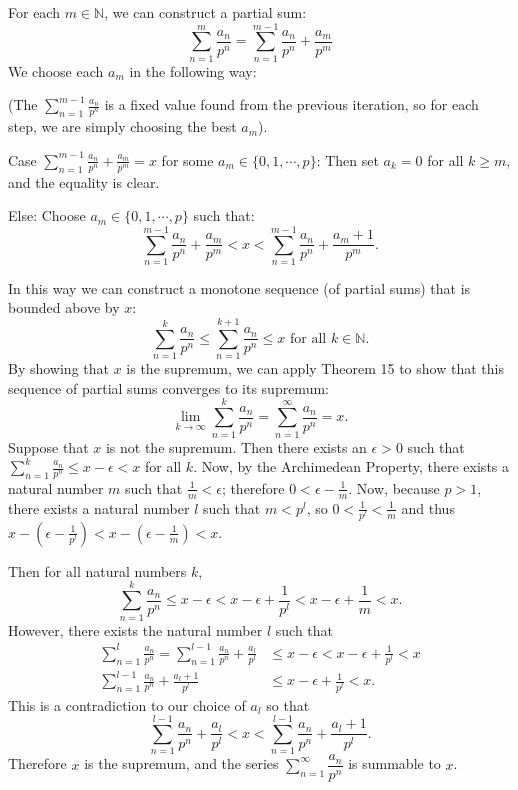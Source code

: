 \begin{enumerate}
	For each $m \in \mathbb{N}$, we can construct a partial sum:
	\[
		\sum_{n=1}^{m} \frac{a_n}{p^n} = \sum_{n=1}^{m-1} \frac{a_n}{p^n} + \frac{a_m}{p^m}	
	\]
	We choose each $a_m$ in the following way:\par
	(The $\sum_{n=1}^{m-1} \frac{a_n}{p^n}$ is a fixed value found from the previous iteration, so for each step, we are simply choosing the best $a_m$).
	\par
	Case $\sum_{n=1}^{m-1} \frac{a_n}{p^n} + \frac{a_m}{p^m} = x$ for some $a_m \in \{0,1,\cdots,p\}$:
	Then set $a_k=0$ for all $k \ge m$, and the equality is clear.\par
	Else: Choose $a_m \in \{0,1,\cdots,p\}$ such that:
	\[
		\sum_{n=1}^{m-1} \frac{a_n}{p^n} + \frac{a_m}{p^m} < x <  \sum_{n=1}^{m-1} \frac{a_n}{p^n} + \frac{a_m+1}{p^m}.	
	\]
	\par
	In this way we can construct a monotone sequence (of partial sums) that is bounded above by $x$:
	\[
	\sum_{n=1}^k \frac{a_n}{p^n} \le \sum_{n=1}^{k+1} \frac{a_n}{p^n} \le x \text{ for all }k \in \mathbb{N}.
	\]
	By showing that $x$ is the supremum, we can apply Theorem 15 to show that this sequence of partial sums converges to its supremum:
	\[
	\lim_{k\to\infty}\sum_{n=1}^k\frac{a_n}{p^n} = \sum_{n=1}^\infty\frac{a_n}{p^n} = x.
	\]
	Suppose that $x$ is not the supremum. 
	Then there exists an $\epsilon > 0$ such that $\sum_{n=1}^k \frac{a_n}{p^n} \le x-\epsilon < x$ for all $k$.
	Now, by the Archimedean Property, there exists a natural number $m$ such that $\frac{1}{m} < \epsilon$; therefore $0 < \epsilon-\frac{1}{m}$.
	Now, because $p>1$, there exists a natural number $l$ such that $m<p^l$, so $0<\frac{1}{p^l}<\frac{1}{m}$ and thus $x-(\epsilon-\frac{1}{p^l})<x-(\epsilon-\frac{1}{m})<x$.\par
	Then for all natural numbers $k$,
	\[
		\sum_{n=1}^k \frac{a_n}{p^n} \le x-\epsilon< x-\epsilon+\frac{1}{p^l}<x-\epsilon+\frac{1}{m}< x.
	\]
	However, there exists the natural number $l$ such that
	\begin{align*}
		\sum_{n=1}^l \frac{a_n}{p^n} = \sum_{n=1}^{l-1} \frac{a_n}{p^n} + \frac{a_l}{p^l}&\le x-\epsilon < x-\epsilon+\frac{1}{p^l}< x\\
		\sum_{n=1}^{l-1} \frac{a_n}{p^n} + \frac{a_l+1}{p^l}& \le x-\epsilon +\frac{1}{p^l}<x.
	\end{align*}
	This is a contradiction to our choice of $a_l$ so that 
	\[
		\sum_{n=1}^{l-1} \frac{a_n}{p^n} + \frac{a_l}{p^l} < x <  \sum_{n=1}^{l-1} \frac{a_n}{p^n} + \frac{a_l+1}{p^l}.	
	\]
	Therefore $x$ is the supremum, and the series $\sum_{n=1}^\infty\dfrac{a_n}{p^n}$ is summable to $x$.\par

\end{enumerate}
